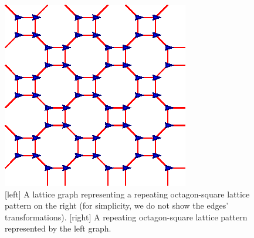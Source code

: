 \begin{figure}
    \centering
    \begin{minipage}[b]{0.45\linewidth}
        \centering
        
    \end{minipage}
    \begin{minipage}[b]{0.45\linewidth}
        \centering
        \includegraphics[scale=0.95]{figs/octsq-lat}
    \end{minipage}
    \caption{[left] A lattice graph representing a repeating octagon-square lattice pattern on the right (for simplicity, we do not show the edges' transformations). [right] A repeating octagon-square lattice pattern represented by the left graph.}
    \label{fig:octagonsquare}
\end{figure}

